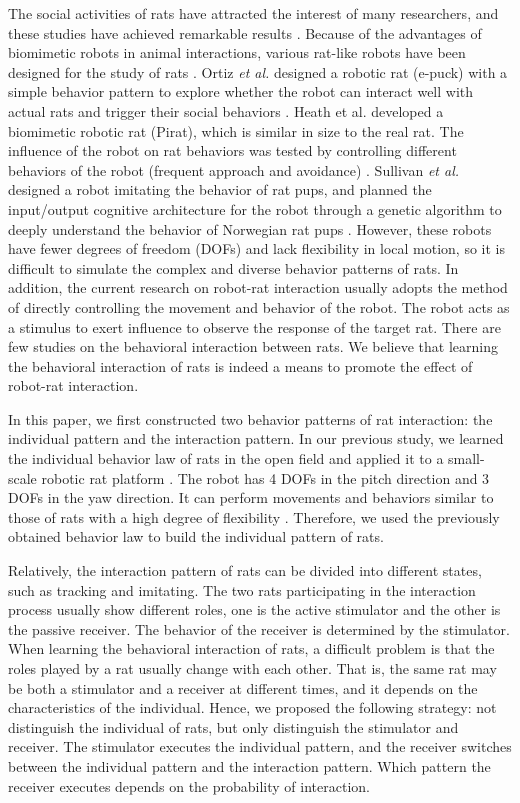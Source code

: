 The social activities of rats have attracted the interest of many researchers,
and these studies have achieved remarkable results
\cite{fleliz_bidirectional_modulation,weiss_shall_two_walk}. Because of the
advantages of biomimetic robots in animal interactions, various rat-like robots
have been designed for the study of rats \cite{Lucas2018DesignOA,Shi_bb_2013,
Shi_bb_2015,shi-gao-tro-2022}. Ortiz \textit{et al.} designed a robotic rat
(e-puck) with a simple behavior pattern to explore whether the robot can
interact well with actual rats and trigger their social behaviors
\cite{Rusalky-sit}. Heath et al. developed a biomimetic robotic rat (Pirat),
which is similar in size to the real rat. The influence of the robot on rat
behaviors was tested by controlling different behaviors of the robot (frequent
approach and avoidance) \cite{pirat}. Sullivan \textit{et al.} designed a robot
imitating the behavior of rat pups, and planned the input/output cognitive
architecture for the robot through a genetic algorithm to deeply understand the
behavior of Norwegian rat pups \cite{sullivan-arl-2015}. However, these robots
have fewer degrees of freedom (DOFs) and lack flexibility in local motion, so it
is difficult to simulate the complex and diverse behavior patterns of rats. In
addition, the current research on robot-rat interaction usually adopts the
method of directly controlling the movement and behavior of the robot. The robot
acts as a stimulus to exert influence to observe the response of the target rat.
There are few studies on the behavioral interaction between rats. We believe
that learning the behavioral interaction of rats is indeed a means to promote
the effect of robot-rat interaction.

In this paper, we first constructed two behavior patterns of rat interaction:
the individual pattern and the interaction pattern. In our previous study, we
learned the individual behavior law of rats in the open field and applied it to
a small-scale robotic rat platform \cite{gao-eng-2022}. The robot has 4 DOFs in
the pitch direction and 3 DOFs in the yaw direction. It can perform movements
and behaviors similar to those of rats with a high degree of flexibility
\cite{shi-gao-tro-2021}. Therefore, we used the previously obtained behavior law
to build the individual pattern of rats.

Relatively, the interaction pattern of rats can be divided into different states,
such as tracking and imitating. The two rats participating in the interaction
process usually show different roles, one is the active stimulator and the other
is the passive receiver. The behavior of the receiver is determined by the
stimulator. When learning the behavioral interaction of rats, a difficult
problem is that the roles played by a rat usually change with each other. That
is, the same rat may be both a stimulator and a receiver at different times, and
it depends on the characteristics of the individual. Hence, we proposed the
following strategy: not distinguish the individual of rats, but only distinguish
the stimulator and receiver. The stimulator executes the individual pattern, and
the receiver switches between the individual pattern and the interaction
pattern. Which pattern the receiver executes depends on the probability of
interaction.

